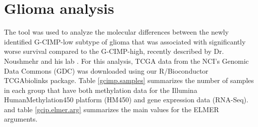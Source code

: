 
\section{Glioma analysis}

The  tool was used to analyze the molecular differences between the newly identified G-CIMP-low subtype of glioma that was associated with significantly worse survival compared to the G-CIMP-high, recently described by Dr. Noushmehr and his lab \cite{cell}. 
For this analysis, TCGA data from the NCI's Genomic Data Commons (GDC) was downloaded using our R/Bioconductor TCGAbiolinks package. Table \ref{gcimp.samples} summarizes the number of samples in each group that have both  methylation data for the Illumina HumanMethylation450 platform (HM450) and gene expression data
(RNA-Seq). and table \ref{gcip.elmer.arg} summarizes the main values for the ELMER arguments.

